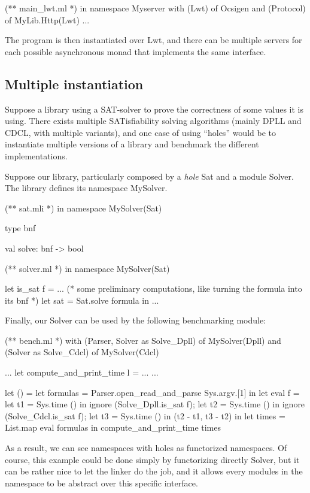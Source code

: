 \documentclass[11pt,a4paper]{article}
\begin{document}
\begin{OCaml}
(** main_lwt.ml *)
in namespace Myserver
  with (Lwt) of Ocsigen
  and (Protocol) of MyLib.Http(Lwt)
...
\end{OCaml}

The program is then instantiated over Lwt, and there can be multiple servers for
each possible asynchronous monad that implements the same interface.

\subsection{Multiple instantiation}

Suppose a library using a SAT-solver to prove the correctness of some values it
is using. There exists multiple SATisfiability solving algorithms (mainly DPLL
and CDCL, with multiple variants), and one case of using ``holes'' would be to
instantiate multiple versions of a library and benchmark the different
implementations.

Suppose our library, particularly composed by a \emph{hole} Sat and a module
Solver. The library defines its namespace MySolver.

\begin{OCaml}
(** sat.mli *)
in namespace MySolver(Sat)

type bnf

val solve: bnf -> bool
\end{OCaml}

\medskip 

\begin{OCaml}
(** solver.ml *)
in namespace MySolver(Sat)

let is_sat f =
... 
(* some preliminary computations, like turning the formula into its bnf *)
  let sat = Sat.solve formula in 
...
\end{OCaml}

\medskip

Finally, our Solver can be used by the following benchmarking module:

\begin{OCaml}
(** bench.ml *)
with (Parser, Solver as Solve_Dpll) of MySolver(Dpll)
and (Solver as Solve_Cdcl) of MySolver(Cdcl)

...
let compute_and_print_time l = ...
...

let () =
  let formulas = 
    Parser.open_read_and_parse Sys.argv.[1] in
  let eval f =
    let t1 = Sys.time () in
    ignore (Solve_Dpll.is_sat f);
    let t2 = Sys.time () in
    ignore (Solve_Cdcl.is_sat f);
    let t3 = Sys.time () in
    (t2 - t1, t3 - t2)
  in
  let times = List.map eval formulas in
  compute_and_print_time times
\end{OCaml}

\medskip

As a result, we can see namespaces with holes as functorized namespaces. Of
course, this example could be done simply by functorizing directly Solver, but
it can be rather nice to let the linker do the job, and it allows every modules
in the namespace to be abstract over this specific interface.

\end{document}
